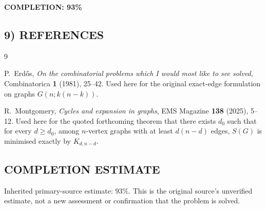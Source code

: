\textbf{COMPLETION: 93\%}

\subsection*{9) REFERENCES}

\begin{thebibliography}{9}

P.~Erd\H{o}s,
\emph{On the combinatorial problems which I would most like to see solved},
Combinatorica \textbf{1} (1981), 25--42.
Used here for the original exact-edge formulation on graphs $G(n; k(n-k))$.

R.~Montgomery,
\emph{Cycles and expansion in graphs},
EMS Magazine \textbf{138} (2025), 5--12.
Used here for the quoted forthcoming theorem that there exists $d_0$ such that for every $d\ge d_0$, among $n$-vertex graphs with at least $d(n-d)$ edges, $S(G)$ is minimised exactly by $K_{d,n-d}$.

\end{thebibliography}


\subsection*{COMPLETION ESTIMATE}
Inherited primary-source estimate: $93\%$. This is the original source's unverified estimate, not a new assessment or confirmation that the problem is solved.
